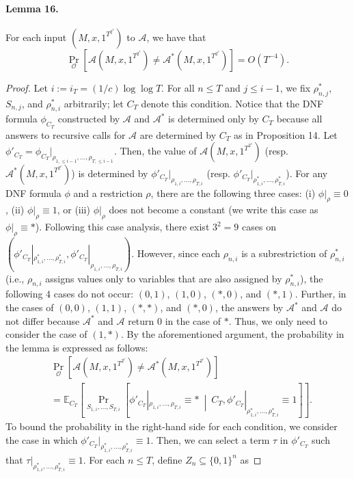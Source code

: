 \documentclass[10pt,a4paper]{article}
\begin{document}
\paragraph{Lemma 16.}
For each input $(M,x,1^{T^{2^c}})$ to $\mathcal A$, we have that
\[\Pr_{\mathcal O}[\mathcal A(M,x,1^{T^{2^c}})\neq\mathcal A^*(M,x,1^{T^{2^c}})]=O(T^{-4}).\]
\begin{proof}
Let $i:=i_T=(1/c)\log\log T$. For all $n\leq T$ and $j\leq i-1$, we fix $\rho^*_{n,j}$, $S_{n,j}$, and $\rho^*_{n,i}$ arbitrarily; let $C_T$ denote this condition. Notice that the DNF formula $\phi_{C_T}$ constructed by $\mathcal A$ and $\mathcal A^*$ is determined only by $C_T$ because all answers to recursive calls for $\mathcal A$ are determined by $C_T$ as in Proposition 14. Let $\phi'_{C_T}=\phi_{C_T}|_{\rho_{1,\leq i-1},\ldots,\rho_{T,\leq i-1}}$. Then, the value of $\mathcal A(M,x,1^{T^{2^c}})$ (resp. $\mathcal A^*(M,x,1^{T^{2^c}})$) is determined by $\phi'_{C_T}|_{\rho_{1,i},\ldots,\rho_{T,i}}$ (resp. $\phi'_{C_T}|_{\rho^*_{1,i},\ldots,\rho^*_{T,i}}$).
For any DNF formula $\phi$ and a restriction $\rho$, there are the following three cases: (i) $\phi|_\rho\equiv0$, (ii) $\phi|_\rho\equiv1$, or (iii) $\phi|_\rho$ does not become a constant (we write this case as $\phi|_\rho\equiv*$). Following this case analysis, there exist $3^2=9$ cases on $(\phi'_{C_T}|_{\rho^*_{1,i},\ldots,\rho^*_{T,i}},\phi'_{C_T}|_{\rho_{1,i},\ldots,\rho_{T,i}})$. However, since each $\rho_{n,i}$ is a subrestriction of $\rho^*_{n,i}$ (i.e., $\rho_{n,i}$ assigns values only to variables that are also assigned by $\rho^*_{n,i}$), the following 4 cases do not occur: $(0,1)$, $(1,0)$, $(*,0)$, and $(*,1)$. Further, in the cases of $(0,0)$, $(1,1)$, $(*,*)$, and $(*,0)$, the answers by $\mathcal A^*$ and $\mathcal A$ do not differ because $\mathcal A^*$ and $\mathcal A$ return 0 in the case of $*$. Thus, we only need to consider the case of $(1,*)$.
By the aforementioned argument, the probability in the lemma is expressed as follows:
\begin{align*}
&\Pr_{\mathcal O}[\mathcal A(M,x,1^{T^{2^c}})\neq\mathcal A^*(M,x,1^{T^{2^c}})]\\
&=\mathbb E_{C_T}\!\left[\Pr_{S_{1,i},\ldots,S_{T,i}}\!\left[\phi'_{C_T}|_{\rho_{1,i},\ldots,\rho_{T,i}}\equiv*\ \middle|\ C_T,\phi'_{C_T}|_{\rho^*_{1,i},\ldots,\rho^*_{T,i}}\equiv1\right]\right].
\end{align*}
To bound the probability in the right-hand side for each condition, we consider the case in which $\phi'_{C_T}|_{\rho^*_{1,i},\ldots,\rho^*_{T,i}}\equiv1$. Then, we can select a term $\tau$ in $\phi'_{C_T}$ such that $\tau|_{\rho^*_{1,i},\ldots,\rho^*_{T,i}}\equiv1$. For each $n\leq T$, define $Z_n\subseteq\{0,1\}^n$ as

\end{proof}
\end{document}
